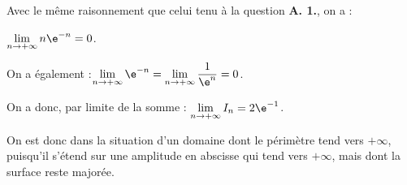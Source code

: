 \begin{enumerate}
\begin{enumerate}
Avec le même raisonnement que celui tenu à la question \textbf{A. 1.}, on a :

$\lim\limits_{n\to +\infty} n\e^{-n} = 0$.

On a également :\quad $\lim\limits_{n\to +\infty} \e^{-n} = \lim\limits_{n\to +\infty} \dfrac{1}{\e^{n}} = 0$.

On a donc, par limite de la somme : \quad $\lim\limits_{n \to +\infty} I_n = 2\e^{-1}$.

On est donc dans la situation d'un domaine dont le périmètre tend vers $+\infty$, puisqu'il s'étend sur une amplitude en abscisse qui tend vers $+\infty$, mais dont la surface reste majorée.
		\end{enumerate}
	\end{enumerate}

\bigskip
